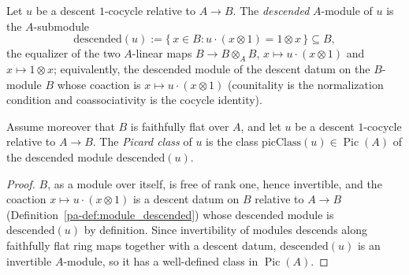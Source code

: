 \begin{definition}
  \label{pa-def:module_descended}
  \leanok

  Let \(u\) be a descent \(1\)-cocycle relative to \(A \to B\). The \emph{descended} \(A\)-module
  of \(u\) is the \(A\)-submodule
  \[
    \mathrm{descended}(u) := \{\, x \in B : u \cdot (x \otimes 1) = 1 \otimes x \,\} \subseteq B,
  \]
  the equalizer of the two \(A\)-linear maps \(B \to B \otimes_A B\), \(x \mapsto u \cdot (x
  \otimes 1)\) and \(x \mapsto 1 \otimes x\); equivalently, the descended module of the descent
  datum on the \(B\)-module \(B\) whose coaction is \(x \mapsto u \cdot (x \otimes 1)\)
  (counitality is the normalization condition and coassociativity is the cocycle identity).
\end{definition}

\begin{definition}
  \label{pa-def:module_picClass}
  \leanok

  Assume moreover that \(B\) is faithfully flat over \(A\), and let \(u\) be a descent
  \(1\)-cocycle relative to \(A \to B\). The \emph{Picard class} of \(u\) is the class
  \(\mathrm{picClass}(u) \in \operatorname{Pic}(A)\) of the descended module
  \(\mathrm{descended}(u)\).
\end{definition}
\begin{proof}
  \leanok
  \(B\), as a module over itself, is free of rank one, hence invertible, and the coaction \(x
  \mapsto u \cdot (x \otimes 1)\) is a descent datum on \(B\) relative to \(A \to B\)
  (Definition~\ref{pa-def:module_descended}) whose descended module is \(\mathrm{descended}(u)\) by
  definition. Since invertibility of modules descends along faithfully flat ring maps together
  with a descent datum, \(\mathrm{descended}(u)\) is an invertible \(A\)-module, so it has a
  well-defined class in \(\operatorname{Pic}(A)\).
\end{proof}

